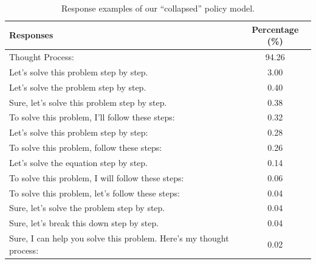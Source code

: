 
\begin{table}
\centering
\begin{tabular}{p{11cm}c}
\toprule
\textbf{Responses} & \textbf{Percentage (\%)} \\
\midrule
Thought Process: & 94.26 \\
Let's solve this problem step by step. & 3.00 \\
Let's solve the problem step by step. & 0.40 \\
Sure, let's solve this problem step by step. & 0.38 \\
To solve this problem, I'll follow these steps: & 0.32\\
Let's solve this problem step by step: &  0.28 \\
To solve this problem, follow these steps: & 0.26  \\
Let's solve the equation step by step.  & 0.14 \\
To solve this problem, I will follow these steps: & 0.06 \\
To solve this problem, let's follow these steps: &  0.04 \\
Sure, let's solve the problem step by step.  &  0.04 \\
Sure, let's break this down step by step. & 0.04 \\
Sure, I can help you solve this problem. Here's my thought process: & 0.02 \\

\bottomrule
\end{tabular}
\caption{Response examples of our ``collapsed'' policy model. }
\label{tab:appendix:examples}
\end{table}